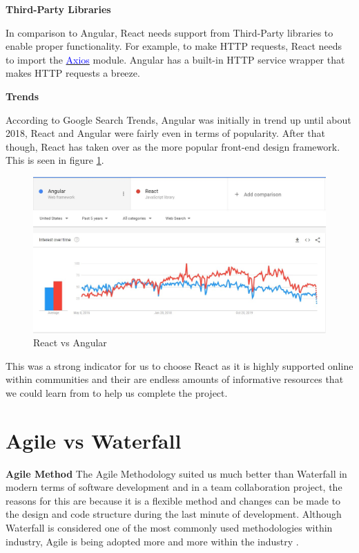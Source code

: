 \textbf{Third-Party Libraries}

In comparison to Angular, React needs support from Third-Party libraries to enable proper functionality. For example, to make HTTP requests, React needs to import the \href{https://github.com/axios/axios}{\textcolor{blue}{Axios}} module. Angular has a built-in HTTP service wrapper that makes HTTP requests a breeze.

\textbf{Trends}

According to Google Search Trends, Angular was initially in trend up until about 2018, React and Angular were fairly even in terms of popularity. After that though, React has taken over as the more popular front-end design framework. This is seen in figure \ref{fig:React vs Angular}.

\begin{figure}[H]
  \centering
  \includegraphics[scale=0.45]{img/react_vs_angular.jpg}
  \caption{React vs Angular}
  \label{fig:React vs Angular}
\end{figure}

This was a strong indicator for us to choose React as it is highly supported online within communities and their are endless amounts of informative resources that we could learn from to help us complete the project.


\section{Agile vs Waterfall }

\textbf{Agile Method}
\newline
The Agile Methodology suited us much better than Waterfall in modern terms of software development and in a team collaboration project, the reasons for this are because it is a flexible method and changes can be made to the design and code structure during the last minute of development. Although Waterfall is considered one of the most commonly used methodologies within industry, Agile is being adopted more and more within the industry \cite{waterfall}.

